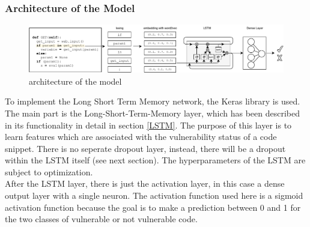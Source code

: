 \documentclass[
	a4paper,
	pagesize,
	pdftex,
	12pt,
	twoside, %
	BCOR=5mm, %
	ngerman,
	fleqn,
	final,
	]{scrartcl}
\begin{document}
\subsubsection{Architecture of the Model}



\begin{figure}[ht]
	\centering
	\includegraphics[width=\linewidth]{img/Architecture}
	\caption{architecture of the model}
	\label{fig:architecture}
\end{figure}

To implement the Long Short Term Memory network, the Keras library is used.\\
The main part is the Long-Short-Term-Memory layer, which has been described in its functionality in detail in section \ref{LSTM}. The purpose of this layer is to learn features which are associated with the vulnerability status of a code snippet. There is no seperate dropout layer, instead, there will be a dropout within the LSTM itself (see next section). The hyperparameters of the LSTM are subject to optimization.\\
After the LSTM layer, there is just the activation layer, in this case a dense output layer with a single neuron. The activation function used here is a sigmoid activation function because the goal is to make a prediction between 0 and 1 for the two classes of vulnerable or not vulnerable code. 




\end{document}
